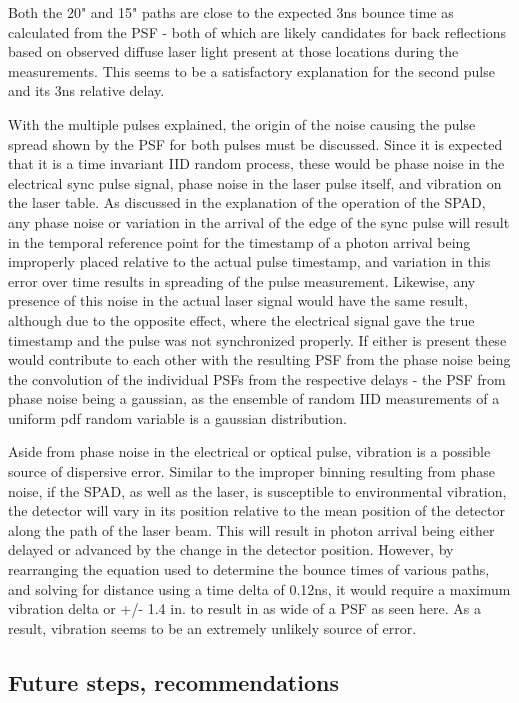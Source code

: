 \documentclass[a4paper]{article}
\begin{document}
Both the 20" and 15" paths are close to the expected 3ns bounce time as calculated from the PSF - both of which are likely candidates for back reflections based on observed diffuse laser light present at those locations during the measurements. This seems to be a satisfactory explanation for the second pulse and its 3ns relative delay.

With the multiple pulses explained, the origin of the noise causing the pulse spread shown by the PSF for both pulses must be discussed. Since it is expected that it is a time invariant IID random process, these would be phase noise in the electrical sync pulse signal, phase noise in the laser pulse itself, and vibration on the laser table. As discussed in the explanation of the operation of the SPAD, any phase noise or variation in the arrival of the edge of the sync pulse will result in the temporal reference point for the timestamp of a photon arrival being improperly placed relative to the actual pulse timestamp, and variation in this error over time results in spreading of the pulse measurement.
Likewise, any presence of this noise in the actual laser signal would have the same result, although due to the opposite effect, where the electrical signal gave the true timestamp and the pulse was not synchronized properly.
If either is present these would contribute to each other with the resulting PSF from the phase noise being the convolution of the individual PSFs from the respective delays - the PSF from phase noise being a gaussian, as the ensemble of random IID measurements of a uniform pdf random variable is a gaussian distribution.

Aside from phase noise in the electrical or optical pulse, vibration is a possible source of dispersive error. Similar to the improper binning resulting from phase noise, if the SPAD, as well as the laser, is susceptible to environmental vibration, the detector will vary in its position relative to the mean position of the detector along the path of the laser beam. This will result in photon arrival being either delayed or advanced by the change in the detector position. However, by rearranging the equation used to determine the bounce times of various paths, and solving for distance using a time delta of 0.12ns, it would require a maximum vibration delta or +/- 1.4 in. to result in as wide of a PSF as seen here. As a result, vibration seems to be an extremely unlikely source of error.

\subsection{Future steps, recommendations}
\end{document}
